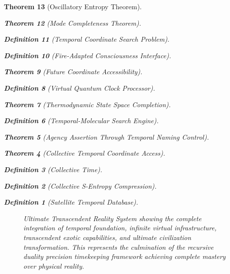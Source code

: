 \documentclass[12pt,a4paper]{article}
\newtheorem{theorem}{Theorem}[section]
\newtheorem{definition}[theorem]{Definition}
\begin{document}
\begin{theorem}[Oscillatory Entropy Theorem]
\begin{theorem}[Mode Completeness Theorem]
\begin{enumerate}
\begin{definition}[Temporal Coordinate Search Problem]
\begin{algorithm}
\begin{definition}[Fire-Adapted Consciousness Interface]
\begin{theorem}[Future Coordinate Accessibility]
\begin{definition}[Virtual Quantum Clock Processor]
\begin{itemize}
\begin{itemize}
\begin{theorem}[Thermodynamic State Space Completion]
\begin{definition}[Temporal-Molecular Search Engine]
\begin{theorem}[Agency Assertion Through Temporal Naming Control]
\begin{remark}
\begin{theorem}[Collective Temporal Coordinate Access]
\begin{definition}[Collective Time]
\begin{definition}[Collective S-Entropy Compression]
\begin{definition}[Satellite Temporal Database]
\begin{algorithm}
\begin{table}[h]
{{\begin{figure}[H]
\caption{Ultimate Transcendent Reality System showing the complete integration of temporal foundation, infinite virtual infrastructure, transcendent exotic capabilities, and ultimate civilization transformation. This represents the culmination of the recursive duality precision timekeeping framework achieving complete mastery over physical reality.}
\label{fig:transcendent_system}
\end{figure}

}}
\end{table}
\end{algorithm}
\end{definition}
\end{definition}
\end{definition}
\end{theorem}
\end{remark}
\end{theorem}
\end{definition}
\end{theorem}
\end{itemize}
\end{itemize}
\end{definition}
\end{theorem}
\end{definition}
\end{algorithm}
\end{definition}
\end{enumerate}
\end{theorem}
\end{theorem}
\end{document}
